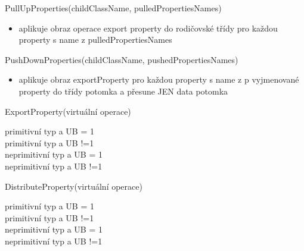\documentclass[11pt,twoside,a4paper]{book}
\begin{document}
\begin{list}{Operace :}{}

\item PullUpProperties(childClassName, pulledPropertiesNames)
 \begin{itemize}
   \item aplikuje obraz operace export property do rodičovské třídy pro každou
   property s name z pulledPropertiesNames
 \end{itemize}

\item PushDownProperties(childClassName, pushedPropertiesNames)
\begin{itemize}
  \item aplikuje obraz exportProperty pro každou property s name z p vyjmenované
  property do třídy potomka a přesune JEN data potomka
\end{itemize}

\item ExportProperty(virtuální operace) 
\begin{description}
	\item[primitivní typ a UB = 1] 
	\item[primitivní typ a UB !=1]
	\item[neprimitivní typ a UB = 1]
	\item[neprimitivní typ a UB !=1]
\end{description}

\item DistributeProperty(virtuální operace) 
\begin{description}
	\item[primitivní typ a UB = 1]
	\item[primitivní typ a UB !=1]
	\item[neprimitivní typ a UB = 1]
	\item[neprimitivní typ a UB !=1]
\end{description}


\end{list}
\end{document}
